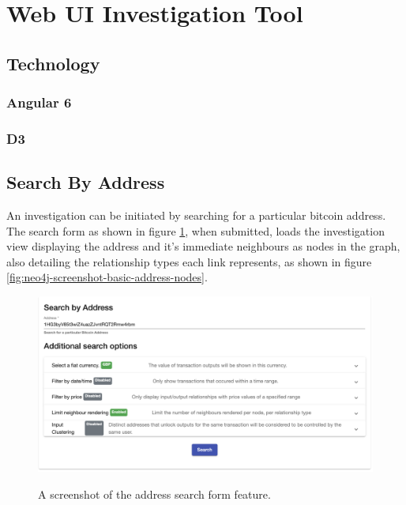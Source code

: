 \section{Web UI Investigation Tool}

\subsection{Technology}
\subsubsection{Angular 6}

\subsubsection{D3}

\subsection{Search By Address}
An investigation can be initiated by searching for a particular bitcoin address. The search form as shown in figure \ref{fig:neo4j-screenshot-search-form}, when submitted, loads the investigation view displaying the address and it's immediate neighbours as nodes in the graph, also detailing the relationship types each link represents, as shown in figure \ref{fig:neo4j-screenshot-basic-address-nodes}. 

\begin{figure}[h!]
  \centering
  \includegraphics[width = 15cm]{./figures/ui-screenshots/search-address-form}\\[0.5cm]
  \caption{A screenshot of the address search form feature.}
  \label{fig:neo4j-screenshot-search-form}
\end{figure}

